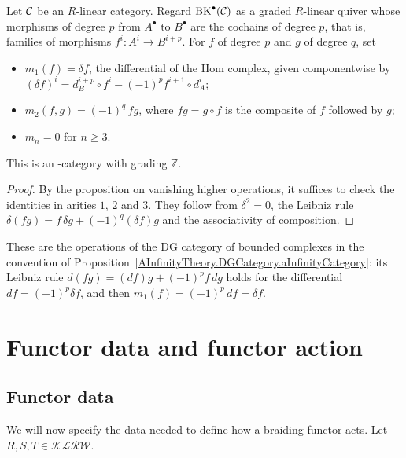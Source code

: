 \begin{proposition}
\label{BoundedCochainComplex.aInfinityCategory}
\leanok
{}
Let $\mathcal{C}$ be an $R$-linear category. Regard $\operatorname{BK}^\bullet(\mathcal{C})$ as a graded $R$-linear quiver whose morphisms
of degree $p$ from $A^\bullet$ to $B^\bullet$ are the cochains of degree $p$, that is, families
of morphisms $f^i \colon A^i \to B^{i+p}$. For $f$ of degree $p$ and $g$ of degree $q$, set
\begin{itemize}
  \item $m_1(f) = \delta f$, the differential of the Hom complex, given componentwise by
  $(\delta f)^i = d_B^{i+p} \circ f^i - (-1)^p f^{i+1} \circ d_A^i$;
  \item $m_2(f, g) = (-1)^q\, f g$, where $f g = g \circ f$ is the composite of $f$ followed by $g$;
  \item $m_n = 0$ for $n \geq 3$.
\end{itemize}
This is an \Ainf{}-category with grading $\mathbb{Z}$.
\end{proposition}

\begin{proof}
\leanok
By the proposition on vanishing higher operations, it suffices to check the identities in
arities $1$, $2$ and $3$. They follow from $\delta^2 = 0$, the Leibniz rule
$\delta(f g) = f\, \delta g + (-1)^q (\delta f) g$ and the associativity of composition.
\end{proof}

\begin{remark}
  These are the operations of the DG category of bounded complexes in the convention of
  Proposition~\ref{AInfinityTheory.DGCategory.aInfinityCategory}: its Leibniz rule
  $d(f g) = (df) g + (-1)^p f\, dg$ holds for the differential $d f = (-1)^p \delta f$, and then
  $m_1(f) = (-1)^p\, d f = \delta f$.
\end{remark}

\section{Functor data and functor action}

\subsection{Functor data}
We will now specify the data needed to define how a braiding functor acts. Let $R, S, T \in \mathcal{KLRW}$.


